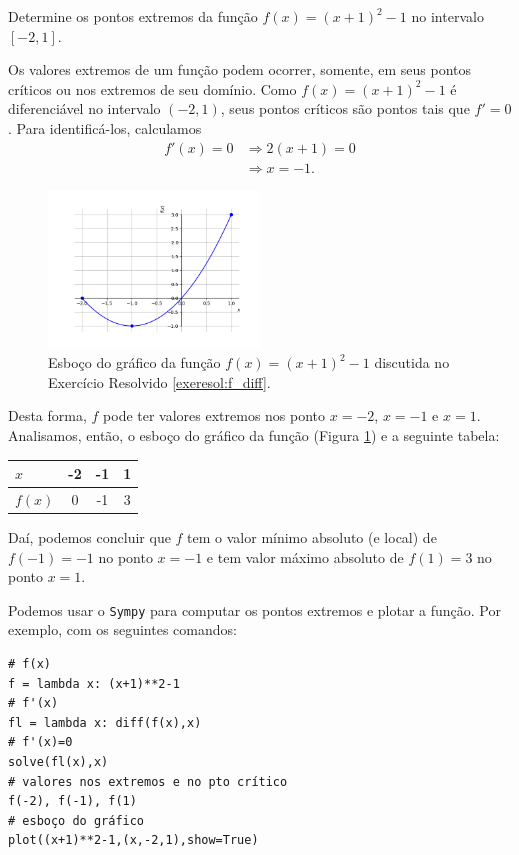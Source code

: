 \begin{exeresol}\label{exeresol:f_diff}
  Determine os pontos extremos da função $f(x) = (x+1)^2-1$ no intervalo $[-2,1]$.
\end{exeresol}
\begin{resol}
  Os valores extremos de um função podem ocorrer, somente, em seus pontos críticos ou nos extremos de seu domínio. Como $f(x) = (x+1)^2-1$ é diferenciável no intervalo $(-2,1)$, seus pontos críticos são pontos tais que $f'=0$. Para identificá-los, calculamos
  \begin{align}
    f'(x)=0 &\Rightarrow 2(x+1) = 0\\
            &\Rightarrow x = -1.
  \end{align}

  \begin{figure}[H]
    \centering
    \includegraphics[width=0.5\textwidth]{./cap_apderiv/dados/fig_exeresol_f_diff/fig_exeresol_f_diff}
    \caption{Esboço do gráfico da função $f(x) = (x+1)^2-1$ discutida no Exercício Resolvido \ref{exeresol:f_diff}.}
    \label{fig:exeresol_f_diff}
  \end{figure}

  Desta forma, $f$ pode ter valores extremos nos ponto $x=-2$, $x=-1$ e $x=1$. Analisamos, então, o esboço do gráfico da função (Figura \ref{fig:exeresol_f_diff}) e a seguinte tabela:\\
  \begin{center}
  \begin{tabular}[H]{l|ccc}
    $x$ & -2 & -1 & 1 \\\hline
    $f(x)$ & 0 & -1 & 3\\\hline
  \end{tabular}
\end{center}
Daí, podemos concluir que $f$ tem o valor mínimo absoluto (e local) de $f(-1)=-1$ no ponto $x=-1$ e tem valor máximo absoluto de $f(1)=3$ no ponto $x=1$.

\begin{ifispython}
  Podemos usar o \verb+Sympy+ para computar os pontos extremos e plotar a função. Por exemplo, com os seguintes comandos:
\begin{verbatim}
# f(x)
f = lambda x: (x+1)**2-1
# f'(x)
fl = lambda x: diff(f(x),x)
# f'(x)=0
solve(fl(x),x)
# valores nos extremos e no pto crítico
f(-2), f(-1), f(1)
# esboço do gráfico
plot((x+1)**2-1,(x,-2,1),show=True)
\end{verbatim}
\end{ifispython}
\end{resol}

